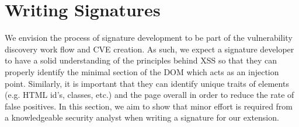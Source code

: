\section{Writing Signatures}

We envision the process of signature development to be part of the vulnerability discovery work flow and CVE creation. As such, we expect a signature developer to have a solid understanding of the principles behind XSS so that they can properly identify the minimal section of the DOM which acts as an injection point. Similarly, it is important that they can identify unique traits of elements (e.g. HTML id's, classes, etc.) and the page overall in order to reduce the rate of false positives. In this section, we aim to show that minor effort is required from a knowledgeable security analyst when writing a signature for our extension.

